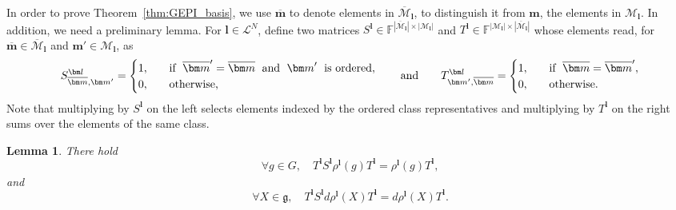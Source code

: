 \documentclass{article}
\newcommand{\rep}[2]{\rho^{#1}_{#2}}
\newcommand{\card}[1]{|{#1}|}
\newtheorem{lemma}[theorem]{Lemma}
\numberwithin{equation}{section}
\def\F{\mathbb{F}}
\def\bl{{\bm l}}
\def\bbm{{\bm m}}
\def\obm{{\overline\bbm}}
\def\calM{\mathcal{M}}
\def\calL{\mathcal{L}}
\def\oMl{\overline{\calM}_\bl}
\def\Nat{{N}}
\begin{document}
In order to prove Theorem~\ref{thm:GEPI_basis}, we use $\obm$ to denote elements in $\oMl$, to distinguish it from $\bbm$, the elements in $\calM_\bl$. In addition, we need a preliminary lemma. For $\bl\in\calL^\Nat$, define two matrices $S^\bl\in\F^{\card{\oMl}\times\card{\calM_{\bl}}}$ and $T^\bl\in\F^{\card{\calM_{\bl}}\times\card{\oMl}}$ whose elements read, for $\obm\in\oMl$ and $\bbm'\in\calM_\bl$, as
    \[
        S^\bl_{\obm,\bbm'} = \begin{cases}
            1, & \quad\textup{if } \; \obm'= \obm \; \textup{ and }\;  \bbm' \; \textup{ is ordered}, \\
            0, & \quad \textup{otherwise,}
        \end{cases} \quad\quad \textup{and} \quad\quad  T^\bl_{\bbm',\obm} = \begin{cases}
            1, & \quad\textup{if }\;  \obm=\obm', \\
            0, & \quad \textup{otherwise.}
        \end{cases}
    \] 
Note that multiplying by $S^\bl$ on the left selects elements indexed by the ordered class representatives and multiplying by $T^\bl$ on the right sums over the elements of the same class.
\begin{lemma}
    There hold
    \begin{equation}\label{eq:TS_lemma}
        \forall g\in G, \quad T^{\bl}S^{\bl}\rep{\bl}{}(g)T^{\bl}=\rep{\bl}{}(g)T^{\bl},
    \end{equation}
    and
    \begin{equation}\label{eq:TS_lemma_lie_alg}
       \forall X\in \mathfrak g,\quad  T^{\bl}S^{\bl} d\rep{\bl}{}(X)T^{\bl}=d\rep{\bl}{}(X)T^{\bl}.
    \end{equation}
\end{lemma}
\end{document}
